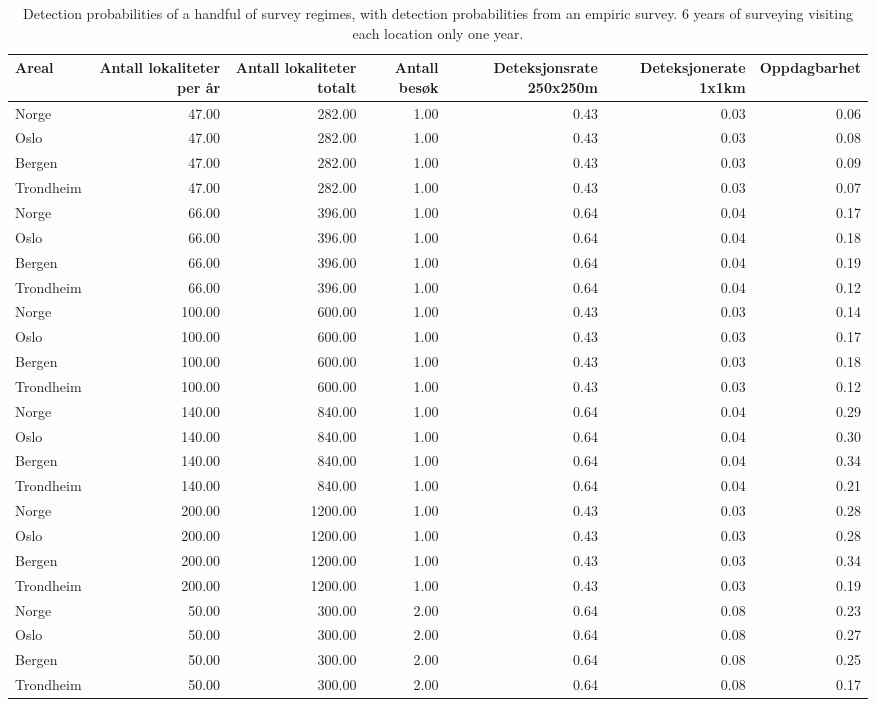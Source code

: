 \documentclass[]{article}
\begin{document}
\begin{table}[ht]
\centering
\begin{tabular}{lrrrrrr}
  \hline
Areal & Antall lokaliteter per år & Antall lokaliteter totalt & Antall besøk & Deteksjonsrate 250x250m & Deteksjonerate 1x1km & Oppdagbarhet \\ 
  \hline
Norge & 47.00 & 282.00 & 1.00 & 0.43 & 0.03 & 0.06 \\ 
  Oslo & 47.00 & 282.00 & 1.00 & 0.43 & 0.03 & 0.08 \\ 
  Bergen & 47.00 & 282.00 & 1.00 & 0.43 & 0.03 & 0.09 \\ 
  Trondheim & 47.00 & 282.00 & 1.00 & 0.43 & 0.03 & 0.07 \\ 
  Norge & 66.00 & 396.00 & 1.00 & 0.64 & 0.04 & 0.17 \\ 
  Oslo & 66.00 & 396.00 & 1.00 & 0.64 & 0.04 & 0.18 \\ 
  Bergen & 66.00 & 396.00 & 1.00 & 0.64 & 0.04 & 0.19 \\ 
  Trondheim & 66.00 & 396.00 & 1.00 & 0.64 & 0.04 & 0.12 \\ 
  Norge & 100.00 & 600.00 & 1.00 & 0.43 & 0.03 & 0.14 \\ 
  Oslo & 100.00 & 600.00 & 1.00 & 0.43 & 0.03 & 0.17 \\ 
  Bergen & 100.00 & 600.00 & 1.00 & 0.43 & 0.03 & 0.18 \\ 
  Trondheim & 100.00 & 600.00 & 1.00 & 0.43 & 0.03 & 0.12 \\ 
  Norge & 140.00 & 840.00 & 1.00 & 0.64 & 0.04 & 0.29 \\ 
  Oslo & 140.00 & 840.00 & 1.00 & 0.64 & 0.04 & 0.30 \\ 
  Bergen & 140.00 & 840.00 & 1.00 & 0.64 & 0.04 & 0.34 \\ 
  Trondheim & 140.00 & 840.00 & 1.00 & 0.64 & 0.04 & 0.21 \\ 
  Norge & 200.00 & 1200.00 & 1.00 & 0.43 & 0.03 & 0.28 \\ 
  Oslo & 200.00 & 1200.00 & 1.00 & 0.43 & 0.03 & 0.28 \\ 
  Bergen & 200.00 & 1200.00 & 1.00 & 0.43 & 0.03 & 0.34 \\ 
  Trondheim & 200.00 & 1200.00 & 1.00 & 0.43 & 0.03 & 0.19 \\ 
  Norge & 50.00 & 300.00 & 2.00 & 0.64 & 0.08 & 0.23 \\ 
  Oslo & 50.00 & 300.00 & 2.00 & 0.64 & 0.08 & 0.27 \\ 
  Bergen & 50.00 & 300.00 & 2.00 & 0.64 & 0.08 & 0.25 \\ 
  Trondheim & 50.00 & 300.00 & 2.00 & 0.64 & 0.08 & 0.17 \\ 
   \hline
\end{tabular}
\caption{Detection probabilities of a handful of survey regimes, with detection probabilities from an empiric survey. 6 years of surveying visiting each location only one year.} 
\end{table}
\end{document}
